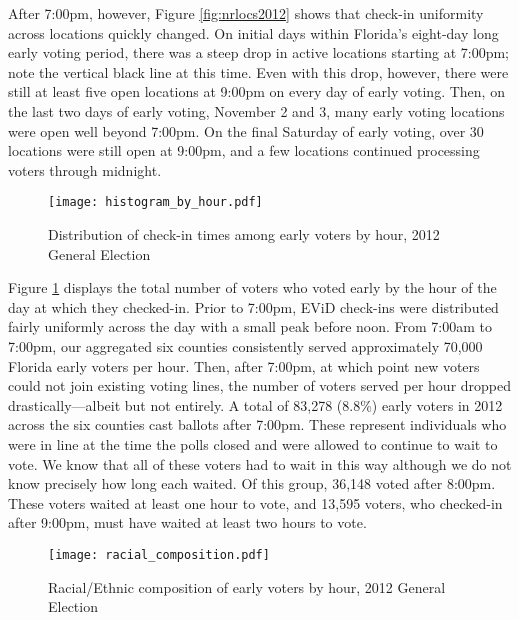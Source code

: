 \documentclass[12pt,titlepage]{article}
\begin{document}
After 7:00pm, however, Figure \ref{fig:nrlocs2012} shows that check-in
uniformity across locations quickly changed.  On initial days within
Florida's eight-day long early voting period, there was a steep drop
in active locations starting at 7:00pm; note the vertical black line
at this time.  Even with this drop, however, there were still at least
five open locations at 9:00pm on every day of early voting.  Then, on
the last two days of early voting, November 2 and 3, many early voting
locations were open well beyond 7:00pm.  On the final Saturday of
early voting, over 30 locations were still open at 9:00pm, and a few
locations continued processing voters through midnight.

\begin{figure}[!ht]
\caption{Distribution of check-in times among early voters by hour, 2012
  General Election}
  \label{fig:hist2012}
  \centering
    \centering\texttt{[image: histogram\_by\_hour.pdf]}
\end{figure}

Figure \ref{fig:hist2012} displays the total number of voters who
voted early by the hour of the day at which they checked-in. Prior to
7:00pm, EViD check-ins were distributed fairly uniformly across the
day with a small peak before noon.  From 7:00am to 7:00pm, our
aggregated six counties consistently served approximately 70,000
Florida early voters per hour. Then, after 7:00pm, at which point new
voters could not join existing voting lines, the number of voters
served per hour dropped drastically---albeit but not entirely.  A
total of 83,278 (8.8\%) early voters in 2012 across the six counties
cast ballots after 7:00pm. These represent individuals who were in
line at the time the polls closed and were allowed to continue to wait
to vote.  We know that all of these voters had to wait in this way
although we do not know precisely how long each waited.  Of this
group, 36,148 voted after 8:00pm.  These voters waited at least one
hour to vote, and 13,595 voters, who checked-in after 9:00pm, must
have waited at least two hours to vote.




\begin{figure}[!ht]
\caption{Racial/Ethnic composition of early voters by hour, 2012 General Election}
  \label{fig:race2012}
  \centering
    \centering\texttt{[image: racial\_composition.pdf]}
\end{figure}
\end{document}
